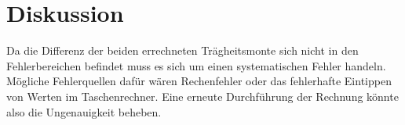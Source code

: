 \section{Diskussion}
Da die Differenz der beiden errechneten Trägheitsmonte sich nicht in den Fehlerbereichen befindet muss es sich um einen systematischen Fehler handeln. Mögliche Fehlerquellen dafür wären Rechenfehler oder das fehlerhafte Eintippen von Werten im Taschenrechner. Eine erneute Durchführung der Rechnung könnte also die Ungenauigkeit beheben.